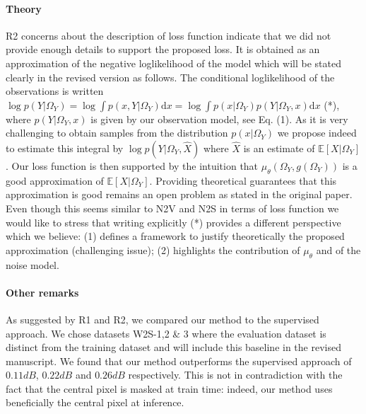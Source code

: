 \documentclass{article}
\begin{document}
\paragraph{Theory}
R2 concerns about the description of loss function indicate that we did not provide enough details to support the proposed loss. It is obtained as an approximation of the negative loglikelihood of the model which will be stated clearly in the revised version as follows.
The conditional loglikelihood of the observations is written $ \log p(Y|\Omega_Y) = \log \int p(x,Y|\Omega_Y) \mathrm{d}x = \log \int p(x|\Omega_Y)p(Y|\Omega_Y,x) \mathrm{d}x$ (*), where $p(Y|\Omega_Y,x)$ is given by our observation model, see Eq. (1).
As it is very challenging to obtain samples from the distribution $p(x|\Omega_Y)$ we propose indeed to estimate this integral by $\log p(Y|\Omega_Y,\hat {X})$ where $\hat {X}$ is an estimate of $\mathbb{E}[X|\Omega_Y]$. Our loss function is then supported by the intuition that $\mu_\theta(\Omega_Y,g(\Omega_Y))$ is a good approximation of $\mathbb{E}[X|\Omega_Y]$. Providing theoretical guarantees that this approximation is good remains an open problem as stated in the original paper. Even though this seems similar to N2V and N2S in terms of loss function we would like to stress that writing explicitly (*) provides a different perspective which we believe:
(1) defines a framework to justify theoretically the proposed approximation (challenging issue); (2) highlights the contribution of $\mu_\theta$ and of the noise model.

\paragraph{Other remarks}
As suggested by R1 and R2, we compared our method to the supervised approach. We chose datasets W2S-1,2 \& 3 where the evaluation dataset is distinct from the training dataset and will include this baseline in the revised manuscript.
We found that our method outperforms the supervised approach of $0.11dB$, $0.22dB$ and $0.26dB$ respectively.
This is not in contradiction with the fact that the central pixel is masked at train time: indeed, our method uses beneficially the central pixel at inference.
\end{document}
